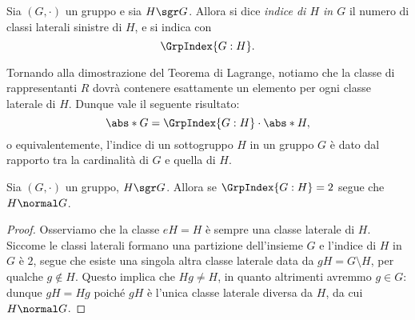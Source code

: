 \begin{definition}
    Sia $(G, \cdot)$ un gruppo e sia $H \sgr G$. Allora si dice \emph{indice di $H$ in $G$} il numero di classi laterali sinistre di $H$, e si indica con \begin{equation}
        \GrpIndex{G:H}.
    \end{equation}
\end{definition}

Tornando alla dimostrazione del Teorema di Lagrange, notiamo che la classe di rappresentanti $R$ dovrà contenere esattamente un elemento per ogni classe laterale di $H$. Dunque vale il seguente risultato:
\begin{equation}
    \label{eq:index}
    \abs*{G} = \GrpIndex{G:H} \cdot \abs*{H}, 
\end{equation} o equivalentemente, l'indice di un sottogruppo $H$ in un gruppo $G$ è dato dal rapporto tra la cardinalità di $G$ e quella di $H$.

\begin{proposition}\label{prop:norm_se_indice2}
    Sia $(G, \cdot)$ un gruppo, $H \sgr G$. Allora se $\GrpIndex{G:H} = 2$ segue che $H \normal G$.
\end{proposition}
\begin{proof}
    Osserviamo che la classe $eH = H$ è sempre una classe laterale di $H$.
    Siccome le classi laterali formano una partizione dell'insieme $G$ e l'indice di $H$ in $G$ è $2$, segue che esiste una singola altra classe laterale
    data da $gH = G \setminus H$, per qualche $g \notin H$.
    Questo implica che $Hg \neq H$, in quanto altrimenti avremmo $g \in G$: dunque $gH = Hg$ poiché $gH$ è l'unica classe laterale diversa da $H$, da cui $H \normal G$.
\end{proof}

